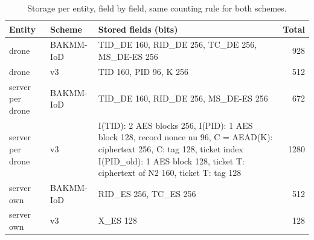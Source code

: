 \begin{table}[!t]
\centering
\footnotesize
\caption{Storage per entity, field by field, same counting rule for both schemes.}
\label{tab:storage}
\setlength{\tabcolsep}{3pt}
\begin{tabular}{p{1.6cm}lp{9.6cm}r}
\toprule
Entity & Scheme & Stored fields (bits) & Total \\
\midrule
drone & BAKMM-IoD & TID\_DE 160, RID\_DE 256, TC\_DE 256, MS\_DE-ES 256 & 928 \\
drone & v3 & TID 160, PID 96, K 256 & 512 \\
server per drone & BAKMM-IoD & TID\_DE 160, RID\_DE 256, MS\_DE-ES 256 & 672 \\
server per drone & v3 & I(TID): 2 AES blocks 256, I(PID): 1 AES block 128, record nonce nu 96, C = AEAD(K): ciphertext 256, C: tag 128, ticket index I(PID\_old): 1 AES block 128, ticket T: ciphertext of N2 160, ticket T: tag 128 & 1280 \\
server own & BAKMM-IoD & RID\_ES 256, TC\_ES 256 & 512 \\
server own & v3 & X\_ES 128 & 128 \\
\bottomrule
\end{tabular}
\end{table}
